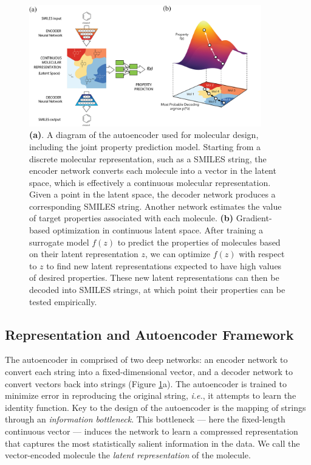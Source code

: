 \begin{figure}
\begin{center}
\includegraphics[width=0.90\textwidth]{fig1.png} 
\caption[Overview of Variational Autoencoder]{\textbf{(a)}. A diagram of the autoencoder used for molecular design, including the joint property prediction model.
Starting from a discrete molecular representation, such as a SMILES string, the encoder network converts each molecule into a vector in the latent space, which is effectively a continuous molecular representation. Given a point in the latent space, the decoder network produces a corresponding SMILES string. Another network estimates the value of target properties associated with each molecule.
\textbf{(b)} Gradient-based optimization in continuous latent space.
After training a surrogate model $f(z)$ to predict the properties of molecules based on their latent representation $z$, we can optimize $f(z)$ with respect to $z$ to find new latent representations expected to have high values of desired properties.
These new latent representations can then be decoded into SMILES strings, at which point their properties can be tested empirically.}
\label{fig:ae_opt_diagrams}
\end{center}
\end{figure}

\subsection{Representation and Autoencoder Framework}
The autoencoder in comprised of two deep networks: an encoder network to convert each string into a fixed-dimensional vector,
and a decoder network to convert vectors back into strings (Figure \ref{fig:ae_opt_diagrams}a).
The autoencoder is trained to minimize error in reproducing the original string, \textit{i.e.}, it attempts to learn the identity function.
Key to the design of the autoencoder is the mapping of strings through an \emph{information bottleneck}.
This bottleneck --- here the fixed-length continuous vector --- induces the network to learn a compressed representation that captures the most statistically salient information in the data.
We call the vector-encoded molecule the \emph{latent representation} of the molecule.

